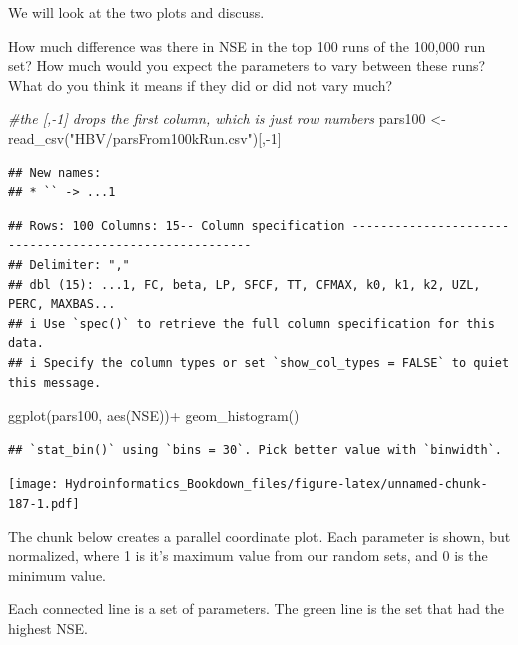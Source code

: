 \documentclass[
]{book}
\newenvironment{Shaded}{\begin{snugshade}}{\end{snugshade}}
\newcommand{\CommentTok}[1]{\textcolor[rgb]{0.56,0.35,0.01}{\textit{#1}}}
\newcommand{\DecValTok}[1]{\textcolor[rgb]{0.00,0.00,0.81}{#1}}
\newcommand{\FunctionTok}[1]{\textcolor[rgb]{0.00,0.00,0.00}{#1}}
\newcommand{\NormalTok}[1]{#1}
\newcommand{\OtherTok}[1]{\textcolor[rgb]{0.56,0.35,0.01}{#1}}
\newcommand{\SpecialCharTok}[1]{\textcolor[rgb]{0.00,0.00,0.00}{#1}}
\newcommand{\StringTok}[1]{\textcolor[rgb]{0.31,0.60,0.02}{#1}}
\begin{document}
We will look at the two plots and discuss.

How much difference was there in NSE in the top 100 runs of the 100,000 run set? How much would you expect the parameters to vary between these runs? What do you think it means if they did or did not vary much?

\begin{Shaded}
\begin{Highlighting}[]
\CommentTok{\#the [,{-}1] drops the first column, which is just row numbers}
\NormalTok{pars100 }\OtherTok{\textless{}{-}} \FunctionTok{read\_csv}\NormalTok{(}\StringTok{"HBV/parsFrom100kRun.csv"}\NormalTok{)[,}\SpecialCharTok{{-}}\DecValTok{1}\NormalTok{]}
\end{Highlighting}
\end{Shaded}

\begin{verbatim}
## New names:
## * `` -> ...1
\end{verbatim}

\begin{verbatim}
## Rows: 100 Columns: 15-- Column specification --------------------------------------------------------
## Delimiter: ","
## dbl (15): ...1, FC, beta, LP, SFCF, TT, CFMAX, k0, k1, k2, UZL, PERC, MAXBAS...
## i Use `spec()` to retrieve the full column specification for this data.
## i Specify the column types or set `show_col_types = FALSE` to quiet this message.
\end{verbatim}

\begin{Shaded}
\begin{Highlighting}[]
\FunctionTok{ggplot}\NormalTok{(pars100, }\FunctionTok{aes}\NormalTok{(NSE))}\SpecialCharTok{+}
  \FunctionTok{geom\_histogram}\NormalTok{()}
\end{Highlighting}
\end{Shaded}

\begin{verbatim}
## `stat_bin()` using `bins = 30`. Pick better value with `binwidth`.
\end{verbatim}

\texttt{[image: Hydroinformatics\_Bookdown\_files/figure-latex/unnamed-chunk-187-1.pdf]}

The chunk below creates a parallel coordinate plot. Each parameter is shown, but normalized, where 1 is it's maximum value from our random sets, and 0 is the minimum value.

Each connected line is a set of parameters. The green line is the set that had the highest NSE.
\end{document}
